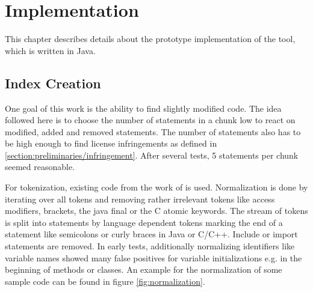 
\chapter{Implementation}\label{chapter:implementation}
This chapter describes details about the prototype implementation of the tool, which is written in Java.

\section{Index Creation}\label{section:implementation/index_creation}
One goal of this work is the ability to find slightly modified code.
The idea followed here is to choose the number of statements in a chunk low to react on modified, added and removed statements.
The number of statements also has to be high enough to find license infringements as defined in \autoref{section:preliminaries/infringement}.
After several tests, 5 statements per chunk seemed reasonable.

For tokenization, existing code from the work of \cite{heinemann2014teamscale} is used.
Normalization is done by iterating over all tokens and removing rather irrelevant tokens like access modifiers, brackets, the java final or the C atomic keywords.
The stream of tokens is split into statements by language dependent tokens marking the end of a statement like semicolons or curly braces in Java or C/C++.
Include or import statements are removed.
In early tests, additionally normalizing identifiers like variable names showed many false positives for variable initializations e.g. in the beginning of methods or classes.
An example for the normalization of some sample code can be found in figure \ref{fig:normalization}.

